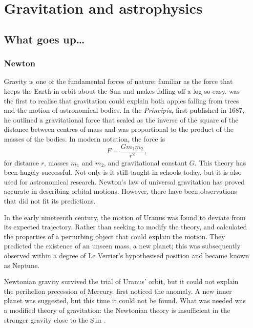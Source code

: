 \chapter{Gravitation and astrophysics}

\section{What goes up\ldots}

\subsection{Newton}

Gravity is one of the fundamental forces of nature; familiar as the force that keeps the Earth in orbit about the Sun and makes falling off a log so easy. \citet[book 3]{Newton1999} was the first to realise that gravitation could explain both apples falling from trees and the motion of astronomical bodies. In the \textit{Principia}, first published in 1687, he outlined a gravitational force that scaled as the inverse of the square of the distance between centres of mass and was proportional to the product of the masses of the bodies. In modern notation, the force is
\begin{equation}
F = \frac{G m_1 m_2}{r^2},
\end{equation}
for distance $r$, masses $m_1$ and $m_2$, and gravitational constant $G$. This theory has been hugely successful. Not only is it still taught in schools today, but it is also used for astronomical research. Newton's law of universal gravitation has proved accurate in describing orbital motions. However, there have been observations that did not fit its predictions.

In the early nineteenth century, the motion of Uranus was found to deviate from its expected trajectory. Rather than seeking to modify the theory, \citet[\textit{troisi{\`e}me partie}]{LeVerrier1846} and \citet[papers 1 and 2]{Adams1896} calculated the properties of a perturbing object that could explain the motion. They predicted the existence of an unseen mass, a new planet; this was subsequently observed within a degree of Le Verrier's hypothesised position \citep[\textit{cinqui{\`e}me partie}]{LeVerrier1846} and became known as Neptune.

Newtonian gravity survived the trial of Uranus' orbit, but it could not explain the perihelion precession of Mercury. \citet[\textit{chapitre XV}, \textit{section quatri{\`e}me}]{LeVerrier1859} first noticed the anomaly. A new inner planet was suggested, but this time it could not be found. What was needed was a modified theory of gravitation: the Newtonian theory is insufficient in the stronger gravity close to the Sun \citep[document 24]{Einstein1997}.

